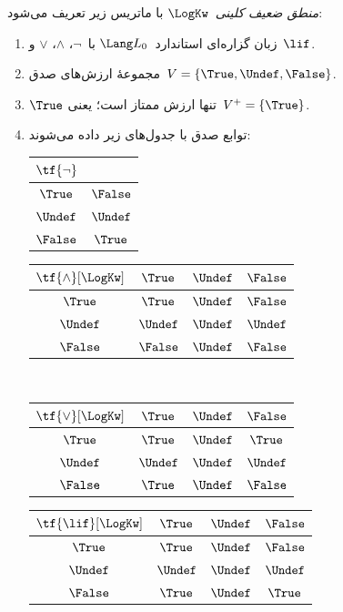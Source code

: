 \documentclass[../../../include/open-logic-section]{subfiles}
\begin{document}
\begin{defn}
\emph{منطق ضعیف کلینی}~$\LogKw$ با ماتریس زیر تعریف می‌شود:
\begin{enumerate}
  \item زبان گزاره‌ای استاندارد~$\Lang L_0$ با~$\lnot$، $\land$،
  $\lor$ و~$\lif$.
  \item مجموعهٔ ارزش‌های صدق~$V = \{\True, \Undef, \False\}$.
  \item $\True$ تنها ارزش ممتاز است؛ یعنی~$V^+ = \{\True\}$.
  \item توابع صدق با جدول‌های زیر داده می‌شوند:
  \begin{center}
    \begin{tabular}{c|c} 
      $\tf{\lnot}$ & \\ 
      \hline  
      $\True$ & $\False$ \\ 
      $\Undef$ & $\Undef$ \\
      $\False$ & $\True$ 
    \end{tabular}
    \quad
    \begin{tabular}{c|ccc} 
      $\tf{\land}[\LogKw]$ & $\True$ & $\Undef$ & $\False$ \\ 
      \hline 
      $\True$ & $\True$ & $\Undef$ & $\False$ \\ 
      $\Undef$ & $\Undef$ & $\Undef$ & $\Undef$\\ 
      $\False$ & $\False$ & $\Undef$ & $\False$ 
    \end{tabular}
    \\[2ex]
    \begin{tabular}{c|ccc} 
      $\tf{\lor}[\LogKw]$ & $\True$ & $\Undef$ & $\False$ \\ 
      \hline 
      $\True$ & $\True$ & $\Undef$ & $\True$ \\ 
      $\Undef$ & $\Undef$ & $\Undef$ & $\Undef$ \\
      $\False$ & $\True$ & $\Undef$ & $\False$ 
    \end{tabular}
    \quad
    \begin{tabular}{c|ccc} 
      $\tf{\lif}[\LogKw]$ & $\True$ & $\Undef$ & $\False$ \\ 
      \hline 
      $\True$ & $\True$ & $\Undef$ & $\False$ \\ 
      $\Undef$ & $\Undef$ & $\Undef$ & $\Undef$  \\ 
      $\False$ & $\True$ & $\Undef$ & $\True$ 
    \end{tabular}
  \end{center} 
\end{enumerate}
\end{defn}
\end{document}
